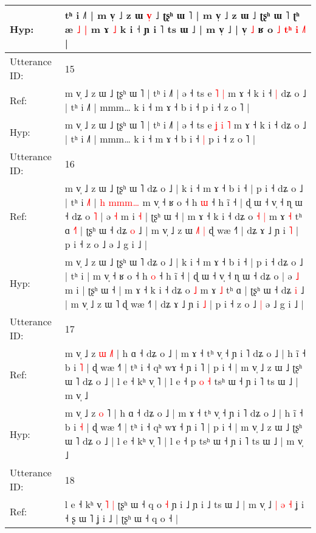 \documentclass[10pt]{article}
\DeclareRobustCommand{\hl}[1]{{\textcolor{red}{#1}}}
\begin{document}
\begin{longtable}{ll}
 \\
Hyp: & tʰ i ˩˥ | m v̩ ˩ z ɯ\hl{ }\hl{v}\hl{̩} ˩ ʈʂʰ ɯ ˥ | m v̩ ˩ z ɯ ˩ ʈʂʰ ɯ ˥\hl{}\hl{} ʈʰ æ \hl{}\hl{˩} \hl{|} m ɤ \hl{˩} k i ˧ ɲ i ˥ ts ɯ ˩ | m v̩ ˩ |\hl{}\hl{} v̩ \hl{˩} ʁ o \hl{˩} \hl{}\hl{}\hl{t}\hl{ʰ} \hl{}\hl{}\hl{i} \hl{}\hl{˩}˥ |
 \\
\midrule
Utterance ID: & 15 \\
Ref: & m v̩ ˩ z ɯ ˩ ʈʂʰ ɯ ˥ | tʰ i ˩˥ | ə ˧ ts e\hl{}\hl{} \hl{˥} \hl{|} m ɤ ˧ k i ˧\hl{ }\hl{|} dʑ o ˩ | tʰ i ˩˥ | mmm… k i ˧ m ɤ ˧ b i ˧\hl{}\hl{} p i ˧ z o ˥ |
 \\
Hyp: & m v̩ ˩ z ɯ ˩ ʈʂʰ ɯ ˥ | tʰ i ˩˥ | ə ˧ ts e\hl{ }\hl{ʝ} \hl{i} \hl{˥} m ɤ ˧ k i ˧\hl{}\hl{} dʑ o ˩ | tʰ i ˩˥ | mmm… k i ˧ m ɤ ˧ b i ˧\hl{ }\hl{|} p i ˧ z o ˥ |
 \\
\midrule
Utterance ID: & 16 \\
Ref: & m v̩ ˩ z ɯ ˩ ʈʂʰ ɯ ˥ dʑ o ˩ | k i ˧ m ɤ ˧ b i ˧ | p i ˧ dʑ o ˩ | tʰ i\hl{ }\hl{˩}\hl{˥} |\hl{ }\hl{h}\hl{ }\hl{m}\hl{m}\hl{m}\hl{…} m v̩ ˧ ʁ o ˧ h \hl{ɯ} ˧ h ĩ ˧ | ɖ ɯ ˧ v̩ ˧ ɳ ɯ ˧ dʑ o\hl{ }\hl{˥} | ə \hl{˧} m i\hl{ }\hl{˧} | ʈʂʰ ɯ ˧ | m ɤ ˧ k i ˧ dʑ o\hl{ }\hl{˧} \hl{|} m ɤ \hl{˧} tʰ ɑ\hl{ }\hl{˧}\hl{˥} | ʈʂʰ ɯ ˧ dʑ \hl{o} ˩ | m v̩ ˩ z ɯ \hl{˩}˥\hl{ }\hl{|} ɖ wæ ˧˥ | dʑ ɤ ˩ ɲ i \hl{˥} | p i ˧ z o ˩\hl{}\hl{} ə ˩ g i ˩ |
 \\
Hyp: & m v̩ ˩ z ɯ ˩ ʈʂʰ ɯ ˥ dʑ o ˩ | k i ˧ m ɤ ˧ b i ˧ | p i ˧ dʑ o ˩ | tʰ i\hl{}\hl{}\hl{} |\hl{}\hl{}\hl{}\hl{}\hl{}\hl{}\hl{} m v̩ ˧ ʁ o ˧ h \hl{o} ˧ h ĩ ˧ | ɖ ɯ ˧ v̩ ˧ ɳ ɯ ˧ dʑ o\hl{}\hl{} | ə \hl{˩} m i\hl{}\hl{} | ʈʂʰ ɯ ˧ | m ɤ ˧ k i ˧ dʑ o\hl{}\hl{} \hl{˩} m ɤ \hl{˩} tʰ ɑ\hl{}\hl{}\hl{} | ʈʂʰ ɯ ˧ dʑ \hl{i} ˩ | m v̩ ˩ z ɯ \hl{}˥\hl{}\hl{} ɖ wæ ˧˥ | dʑ ɤ ˩ ɲ i \hl{˩} | p i ˧ z o ˩\hl{ }\hl{|} ə ˩ g i ˩ |
 \\
\midrule
Utterance ID: & 17 \\
Ref: & m v̩ ˩ z \hl{ɯ} \hl{˩}˥ | h ɑ ˧ dʑ o ˩ | m ɤ ˧ tʰ v̩ ˧ ɲ i ˥ dʑ o ˩ | h ĩ ˧ b i \hl{˥} | ɖ wæ ˧˥ | tʰ i ˧ qʰ wɤ ˧ ɲ i ˥ | p i ˧ | m v̩ ˩ z ɯ ˩ ʈʂʰ ɯ ˥ dʑ o ˩ | l e ˧ kʰ v̩ ˥ | l e ˧ p\hl{ }\hl{o}\hl{ }\hl{˧} tsʰ ɯ ˧ ɲ i ˥ ts ɯ ˩ | m v̩ ˩
 \\
Hyp: & m v̩ ˩ z \hl{o} \hl{}˥ | h ɑ ˧ dʑ o ˩ | m ɤ ˧ tʰ v̩ ˧ ɲ i ˥ dʑ o ˩ | h ĩ ˧ b i \hl{˧} | ɖ wæ ˧˥ | tʰ i ˧ qʰ wɤ ˧ ɲ i ˥ | p i ˧ | m v̩ ˩ z ɯ ˩ ʈʂʰ ɯ ˥ dʑ o ˩ | l e ˧ kʰ v̩ ˥ | l e ˧ p\hl{}\hl{}\hl{}\hl{} tsʰ ɯ ˧ ɲ i ˥ ts ɯ ˩ | m v̩ ˩
 \\
\midrule
Utterance ID: & 18 \\
Ref: & l e ˧ kʰ v̩\hl{ }\hl{˥} \hl{|} ʈʂʰ ɯ ˧ q o\hl{}\hl{}\hl{}\hl{} \hl{˧} ɲ i ˩ ɲ i ˩ ts ɯ ˩ | m v̩ ˩\hl{ }\hl{|}\hl{ }\hl{ə}\hl{ }\hl{˧} ʝ i ˧ ʂ ɯ ˥ ʝ i ˩ | ʈʂʰ ɯ ˧ q o ˧ |

\end{longtable}
\end{document}
